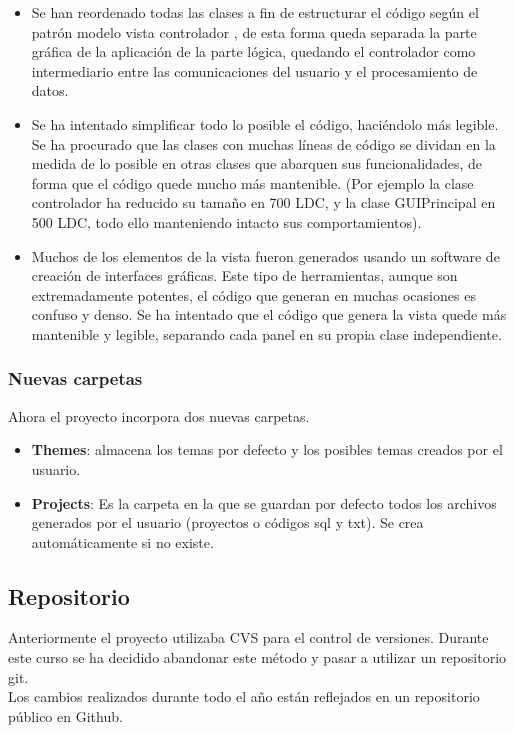 \begin{itemize}
    \item Se han reordenado todas las clases a fin de estructurar el código según el patrón modelo vista controlador \cite{mvc}, de esta forma queda separada la parte gráfica de la aplicación de la parte lógica, quedando el controlador como intermediario entre las comunicaciones del usuario y el procesamiento de datos.
    
    \item Se ha intentado simplificar todo lo posible el código, haciéndolo más legible. Se ha procurado que las clases con muchas líneas de código se dividan en la medida de lo posible en otras clases que abarquen sus funcionalidades, de forma que el código quede mucho más mantenible. (Por ejemplo la clase controlador ha reducido su tamaño en 700 LDC, y la clase GUIPrincipal en 500 LDC, todo ello manteniendo intacto sus comportamientos).
    
    \item Muchos de los elementos de la vista fueron generados usando un software de creación de interfaces gráficas. Este tipo de herramientas, aunque son extremadamente potentes, el código que generan en muchas ocasiones es confuso y denso. Se ha intentado que el código que genera la vista quede más mantenible y legible, separando cada panel en su propia clase independiente.
\end{itemize}
\subsubsection{Nuevas carpetas}
Ahora el proyecto incorpora dos nuevas carpetas.
\begin{itemize}
    \item \textbf{Themes}: almacena los temas por defecto y los posibles temas creados por el usuario.
    \item \textbf{Projects}: Es la carpeta en la que se guardan por defecto todos los archivos generados por el usuario (proyectos o códigos sql y txt). Se crea automáticamente si no existe.
\end{itemize}
\subsection{Repositorio}
Anteriormente el proyecto utilizaba CVS \cite{cvs} para el control de versiones. Durante este curso se ha decidido abandonar este método y pasar a utilizar un repositorio git.\\

Los cambios realizados durante todo el año están reflejados en un repositorio público \cite{repo} en Github.